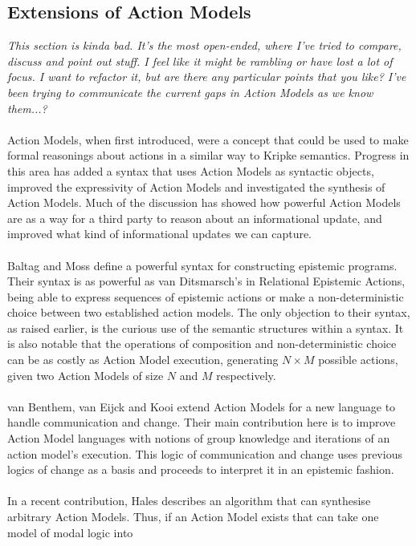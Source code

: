 \documentclass[12pt, a4paper, twoside]{article}
\begin{document}
\subsection{Extensions of Action Models}
{\em This section is kinda bad.
It's the most open-ended, where I've tried to compare, discuss and point out
	stuff.
I feel like it might be rambling or have lost a lot of focus.
I want to refactor it, but are there any particular points that you like?
I've been trying to communicate the current gaps in Action Models as we know
them...?}\\
\\
Action Models, when first introduced, were a concept that could be used to make
formal reasonings about actions in a similar way to Kripke semantics.
Progress in this area has added a syntax that uses Action Models as syntactic
objects, improved the expressivity of Action Models and investigated the
synthesis of Action Models.
Much of the discussion has showed how powerful Action Models are as a way for a
third party to reason about an informational update, and improved what kind of
informational updates we can capture.\\
\\
Baltag and Moss define a powerful syntax for constructing epistemic programs.
Their syntax is as powerful as van Ditsmarsch's in Relational Epistemic Actions,
being able to express sequences of epistemic actions or make a non-deterministic
choice between two established action models.
The only objection to their syntax, as raised earlier, is the curious use of
the semantic structures within a syntax.
It is also notable that the operations of composition and non-deterministic
choice can be as costly as Action Model execution, generating $N \times M$
possible actions, given two Action Models of size $N$ and $M$
respectively.\citep{baltag2005programs}\\
\\
van Benthem, van Eijck and Kooi extend Action Models for a new language to
handle communication and change.
Their main contribution here is to improve Action Model languages with notions
of group knowledge and iterations of an action model's execution.
This logic of communication and change uses previous logics of change as a basis
and proceeds to interpret it in an epistemic fashion.\citep{benthem2006lcc}\\
\\
In a recent contribution, Hales describes an algorithm that can synthesise arbitrary
Action Models.
Thus, if an Action Model exists that can take one model of modal logic into
\end{document}
